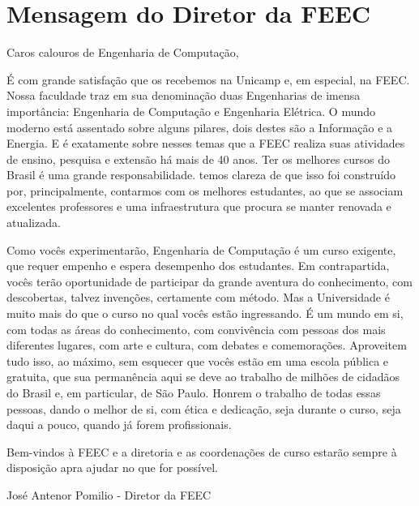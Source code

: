 
\section{Mensagem do Diretor da FEEC}

Caros calouros de Engenharia de Computação,

É com grande satisfação que os recebemos na Unicamp e, em especial, na FEEC.
Nossa faculdade traz em sua denominação duas Engenharias de imensa importância:
Engenharia de Computação e Engenharia Elétrica.  O mundo moderno está assentado
sobre alguns pilares, dois destes são a Informação e a Energia.  E é exatamente
sobre nesses temas que a FEEC realiza suas atividades de ensino, pesquisa e
extensão há mais de 40 anos.  Ter os melhores cursos do Brasil é uma grande
responsabilidade. temos clareza de que isso foi construído por, principalmente,
contarmos com os melhores estudantes, ao que se associam excelentes professores
e uma infraestrutura que procura se manter renovada e atualizada.

Como vocês
experimentarão, Engenharia de Computação é um curso exigente, que requer
empenho e espera desempenho dos estudantes. Em contrapartida, vocês terão
oportunidade de participar da grande aventura do conhecimento, com descobertas,
talvez invenções, certamente com método.  Mas a Universidade é muito mais do
que o curso no qual vocês estão ingressando. É um mundo em si, com todas as
áreas do conhecimento, com convivência com pessoas dos mais diferentes lugares,
com arte e cultura, com debates e comemorações.  Aproveitem tudo isso, ao
máximo, sem esquecer que vocês estão em uma escola pública e gratuita, que sua
permanência aqui se deve ao trabalho de milhões de cidadãos do Brasil e, em
particular, de São Paulo. Honrem o trabalho de todas essas pessoas, dando o
melhor de si, com ética e dedicação, seja durante o curso, seja daqui a pouco,
quando já forem profissionais.

Bem-vindos à FEEC e a diretoria e as
coordenações de curso estarão sempre à disposição apra ajudar no que for
possível.


José Antenor Pomilio - Diretor da FEEC
